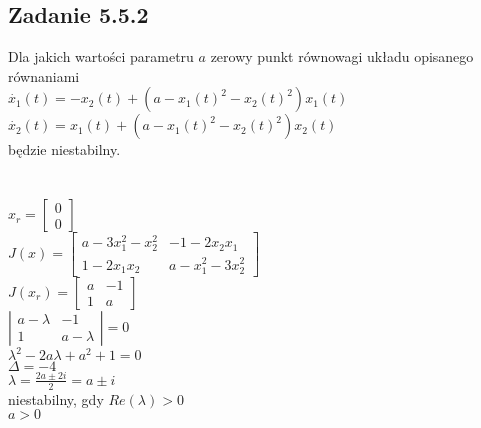 \subsection*{Zadanie 5.5.2} {\color{darkgray}
	Dla jakich wartości parametru $a$ zerowy punkt równowagi układu opisanego równaniami\\
	$\dot{x_1}(t)=-x_2(t)+(a-x_1(t)^2-x_2(t)^2)x_1(t)$\\
	$\dot{x_2}(t)=x_1(t)+(a-x_1(t)^2-x_2(t)^2)x_2(t)$\\
	będzie niestabilny.\\
}\lineh
\\\\
$x_r=\left[ \begin{array}{c}     0\\0   \end{array}\right]$\\
$J(x)=\left[ \begin{array}{cc}   a-3x_1^2-x_2^2 & -1-2x_2x_1 \\ 1-2x_1x_2 & a-x_1^2-3x_2^2    \end{array}\right]$\\
$J(x_r)=\left[ \begin{array}{cc}    a & -1 \\ 1 & a    \end{array}\right]$\\
$\left| \begin{array}{cc}     a-\lambda & -1 \\ 1 & a-\lambda   \end{array}\right|=0$\\
$\lambda^2-2a\lambda+a^2+1=0$\\
$\Delta=-4$\\
$\lambda = \frac{2a \pm 2i}{2}=a \pm i$\\
niestabilny, gdy $Re(\lambda)>0$\\
$\boxed{a>0}$\\



\pagebreak
